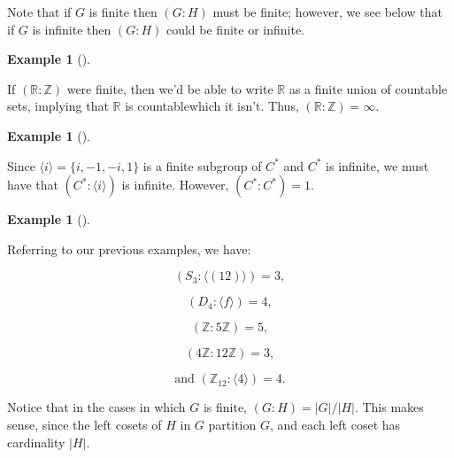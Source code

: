 \documentclass[10pt,]{book}
\theoremstyle{plain}
\theoremstyle{definition}
\theoremstyle{definition}
\theoremstyle{definition}
\newtheorem{example}[theorem]{Example}
\theoremstyle{definition}
\numberwithin{equation}{section}
\def\Z{\mathbb{Z}}
\def\R{\mathbb{R}}
\begin{document}
    Note that if \(G\) is finite then \((G:H)\) must be finite; however,
    we see below that if \(G\) is infinite then \((G:H)\) could be finite or
    infinite. 
\begin{example}[]\label{example-76}

        If \((\R:\Z)\) were finite, then we'd be able to
        write \(\R\) as a finite union of countable sets, implying that
        \(\R\) is countable\textemdash{}which it isn't. Thus, \((\R:\Z)=\infty\).
\end{example}
\begin{example}[]\label{example-77}

        Since \(\langle i\rangle =\{i,-1,-i,1\}\) is a finite subgroup
        of \(C^*\) and \(C^*\) is infinite, we must have that \((C^*:\langle i\rangle )\) is
        infinite. However, \((C^*:C^*)=1\).
\end{example}
\begin{example}[]\label{indices_ex}

        Referring to our previous examples, we have: 




\begin{equation*}
(S_3:\langle (12)\rangle )=3,
\end{equation*}

\begin{equation*}
(D_4:\langle f\rangle )=4,
\end{equation*}

\begin{equation*}
(\Z:5\Z)=5,
\end{equation*}

\begin{equation*}
(4\Z:12\Z)=3,
\end{equation*}

\begin{equation*}
\text{and }(\Z_{12}:\langle 4\rangle )=4.
\end{equation*}

\end{example}
\par

    Notice that in the cases in which \(G\) is finite,
    \((G:H)=|G|/|H|\). This makes sense, since the left cosets of \(H\) in \(G\) partition \(G\), and each left coset has cardinality \(|H|\).
\par
\end{document}
